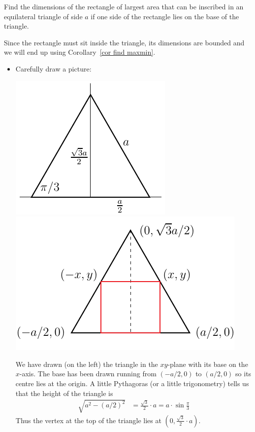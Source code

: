 \begin{eg}\label{APPglobalMaxMinE}
Find the dimensions of the rectangle of largest area that can be inscribed in an
equilateral triangle of side $a$ if one side of the rectangle lies on the base
of the triangle.

\soln Since the rectangle must sit inside the triangle, its dimensions are
bounded and we will end up using Corollary~\ref{cor find maxmin}.
\begin{itemize}
 \item Carefully draw a picture:
\begin{efig}
\begin{center}
   \includegraphics{inscribedB}
  \quad
   \includegraphics{inscribed}
\end{center}
\end{efig}
We have drawn (on the left) the triangle in the $xy$-plane with its base on the
$x$-axis. The base has been drawn running from $(-a/2,0)$ to $(a/2,0)$ so
its centre lies at the origin. A little Pythagoras (or a little trigonometry)
tells us that the height of the triangle is
\begin{align*}
  \sqrt{a^2-(a/2)^2} &= \frac{\sqrt{3}}{2}\cdot a = a\cdot \sin\frac{\pi}{3}
\end{align*}
Thus the vertex at the top of the triangle lies at
$\left(0,\frac{\sqrt{3}}{2}\cdot a\right)$.


\end{itemize}
\end{eg}
